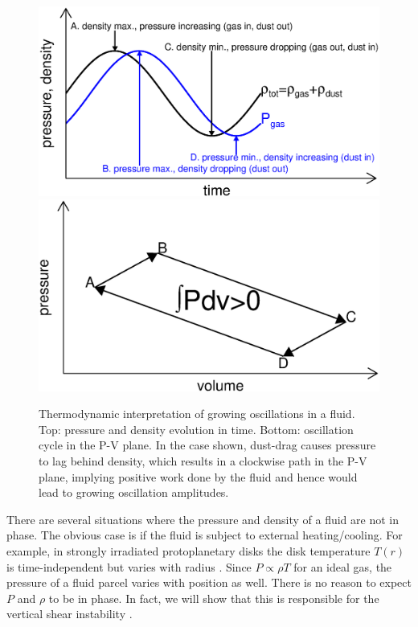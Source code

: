 \documentclass[iop, numberedappendix]{emulateapj}
\begin{document}
\begin{figure}
  \includegraphics[width=\linewidth]{figures/drag}\\
\includegraphics[width=\linewidth]{figures/pdv}
  \caption{Thermodynamic interpretation of growing oscillations in a
    fluid. Top: pressure and density evolution in time. 
    Bottom: oscillation cycle in the P-V plane. In the case shown, 
    dust-drag causes 
    pressure to lag behind density, which results in a clockwise path in
    the P-V plane, implying positive work done by the fluid and
    hence would lead to growing oscillation amplitudes.  
    \label{pdv_cartoon}
  }
\end{figure}

There are several situations where the pressure and density of a fluid
are not in phase. The obvious case is if the fluid is subject to
external heating/cooling. For example, in strongly irradiated
protoplanetary disks the
disk temperature  $T(r)$ is time-independent but varies with radius
\citep{chiang97}. Since $P\propto \rho T$ for an ideal gas, the pressure of a fluid parcel varies with 
position as well. There is no reason to expect $P$ and $\rho$ to
be in phase. In fact, we will show that this is responsible for 
the vertical shear instability \citep{lin15}.  
\end{document}

